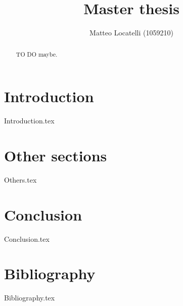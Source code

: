 \documentclass[]{article}
\title{Master thesis}
\author{Matteo Locatelli (1059210)}
\begin{document}
	
	\begin{titlepage}
		\maketitle
	\end{titlepage}
	
	\tableofcontents
	\listoffigures
	\pagebreak
	
	
	\begin{abstract}
		TO DO maybe.	
	\end{abstract}
	
	\section{Introduction}
	{Introduction.tex}
	\pagebreak
	
	\section{Other sections}
	{Others.tex}
	\pagebreak
	
	\section{Conclusion}
	{Conclusion.tex}
	\pagebreak
	
	\section{Bibliography}
	{Bibliography.tex}
	\pagebreak
	
\end{document}

